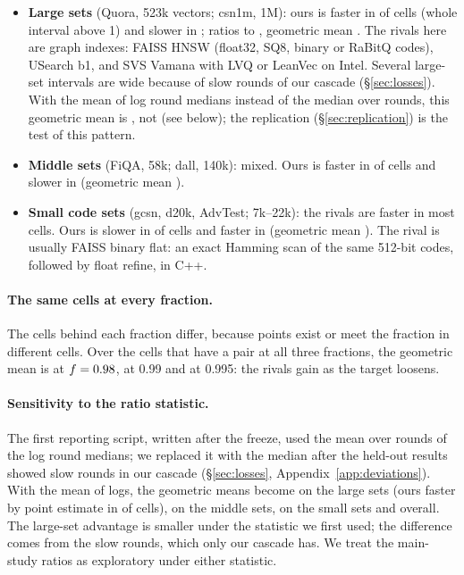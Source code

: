 \begin{itemize}\setlength{\itemsep}{1pt}
\item \textbf{Large sets} (Quora, 523k vectors; csn1m, 1M): ours is faster in  of
 cells (whole interval above 1) and slower in ; ratios  to
, geometric mean . The rivals here are graph indexes: FAISS HNSW (float32,
SQ8, binary or RaBitQ codes), USearch b1, and SVS Vamana with LVQ or LeanVec on Intel. Several large-set
intervals are wide because of slow rounds of our cascade (\S\ref{sec:losses}). With the mean of log round medians
instead of the median over rounds, this geometric mean is , not  (see below); the
replication (\S\ref{sec:replication}) is the test of this pattern.
\item \textbf{Middle sets} (FiQA, 58k; dall, 140k): mixed. Ours is faster in  of
 cells and slower in  (geometric mean ).
\item \textbf{Small code sets} (gcsn, d20k, AdvTest; 7k--22k): the rivals are faster in most cells. Ours
is slower in  of  cells and faster in  (geometric mean
). The rival is usually FAISS binary flat: an exact Hamming scan of the same 512-bit codes,
followed by float refine, in C++.
\end{itemize}

\paragraph{The same cells at every fraction.} The cells behind each fraction differ, because points
exist or meet the fraction in different cells. Over the  cells that have a pair at all three
fractions, the geometric mean is  at $f = 0.98$,  at 0.99 and
 at 0.995: the rivals gain as the target loosens.

\paragraph{Sensitivity to the ratio statistic.} The first reporting script, written after the freeze,
used the mean over rounds of the log round medians; we replaced it with the median after the held-out
results showed slow rounds in our cascade (\S\ref{sec:losses}, Appendix~\ref{app:deviations}). With the
mean of logs, the geometric means become  on the large sets (ours faster by point
estimate in  of  cells),  on
the middle sets,  on the small sets and  overall. The
large-set advantage is smaller under the statistic we first used; the difference comes from the slow rounds, which only
our cascade has. We treat the main-study ratios as exploratory under either statistic.

